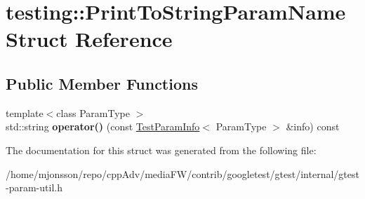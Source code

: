 \hypertarget{structtesting_1_1PrintToStringParamName}{}\section{testing\+:\+:Print\+To\+String\+Param\+Name Struct Reference}
\label{structtesting_1_1PrintToStringParamName}
\subsection*{Public Member Functions}
\begin{DoxyCompactItemize}
\item 
\mbox{\label{structtesting_1_1PrintToStringParamName_a05b411cfb75dadb2c3c0355aee1dcf21}} 
{\footnotesize template$<$class Param\+Type $>$ }\\std\+::string {\bfseries operator()} (const \hyperlink{structtesting_1_1TestParamInfo}{Test\+Param\+Info}$<$ Param\+Type $>$ \&info) const
\end{DoxyCompactItemize}


The documentation for this struct was generated from the following file\+:\begin{DoxyCompactItemize}
\item 
/home/mjonsson/repo/cpp\+Adv/media\+F\+W/contrib/googletest/gtest/internal/gtest-\/param-\/util.\+h\end{DoxyCompactItemize}
